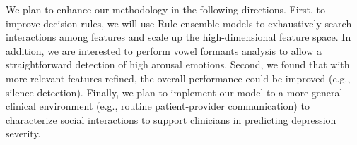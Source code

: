 \documentclass[letterpaper]{article} %
\begin{document}
We plan to enhance our methodology in the following directions. First, to improve decision rules, we will use Rule ensemble models to exhaustively search interactions among features and scale up the high-dimensional feature space. In addition, we are interested to perform vowel formants analysis to allow a straightforward detection of high arousal emotions. Second, we found that with more relevant features refined, the overall performance could be improved (e.g.,  silence detection). Finally, we plan to implement our model to a more general clinical environment (e.g., routine patient-provider communication) to characterize social interactions to support clinicians in predicting depression severity. 

 



\end{document}
